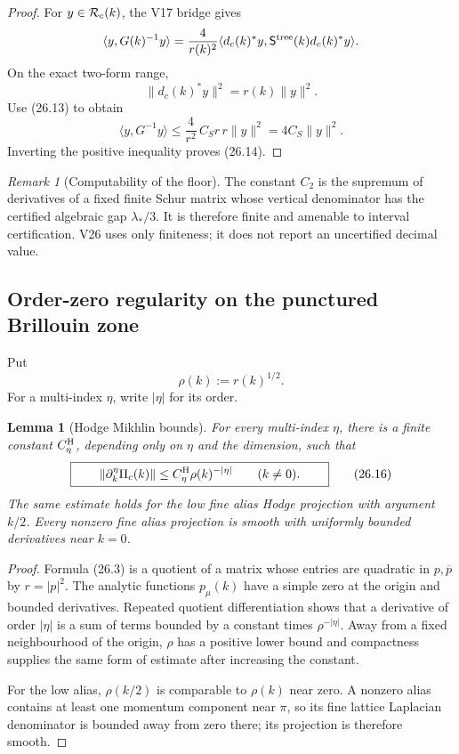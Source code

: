 \documentclass[11pt,oneside]{book}
\newtheorem{lemma}[theorem]{Lemma}
\theoremstyle{definition}
\theoremstyle{remark}
\newtheorem{remark}[theorem]{Remark}
\begin{document}
\begin{proof}
For \(y\in{\cal R}_c(k)\), the V17 bridge gives
\[
 \langle y,G(k)^{-1}y\rangle
 =\frac4{r(k)^2}
 \langle d_c(k)^*y,\mathsf S^{\rm tree}(k)d_c(k)^*y\rangle.
\]
On the exact two-form range,
\[
                  \|d_c(k)^*y\|^2=r(k)\|y\|^2.
\]
Use (26.13) to obtain
\[
 \langle y,G^{-1}y\rangle
 \leq\frac4{r^2}\,C_Sr\,r\|y\|^2
 =4C_S\|y\|^2.
\]
Inverting the positive inequality proves (26.14).
\end{proof}

\begin{remark}[Computability of the floor]
\label{rem:e8v26-computable-floor}
The constant \(C_2\) is the supremum of derivatives of a fixed finite
Schur matrix whose vertical denominator has the certified algebraic
gap \(\lambda_*/3\).  It is therefore finite and amenable to interval
certification.  V26 uses only finiteness; it does not report an
uncertified decimal value.
\end{remark}

\subsection{Order-zero regularity on the punctured Brillouin zone}

Put
\[
                              \rho(k):=r(k)^{1/2}.                 \tag{26.15}
\]
For a multi-index \(\eta\), write \(|\eta|\) for its order.

\begin{lemma}[Hodge Mikhlin bounds]
\label{lem:e8v26-Hodge-Mikhlin}
For every multi-index \(\eta\), there is a finite constant
\(C_\eta^{\rm H}\), depending only on \(\eta\) and the dimension, such
that
\[
\boxed{\qquad
 \|\partial_k^\eta\Pi_c(k)\|
 \leq C_\eta^{\rm H}\rho(k)^{-|\eta|}
 \qquad(k\ne0).
\qquad}                                                           \tag{26.16}
\]
The same estimate holds for the low fine alias Hodge projection with
argument \(k/2\).  Every nonzero fine alias projection is smooth with
uniformly bounded derivatives near \(k=0\).
\end{lemma}

\begin{proof}
Formula (26.3) is a quotient of a matrix whose entries are quadratic
in \(p,\overline p\) by \(r=|p|^2\).  The analytic functions
\(p_\mu(k)\) have a simple zero at the origin and bounded derivatives.
Repeated quotient differentiation shows that a derivative of order
\(|\eta|\) is a sum of terms bounded by a constant times
\(\rho^{-|\eta|}\).  Away from a fixed neighbourhood of the origin,
\(\rho\) has a positive lower bound and compactness supplies the same
form of estimate after increasing the constant.

For the low alias, \(\rho(k/2)\) is comparable to \(\rho(k)\) near
zero.  A nonzero alias contains at least one momentum component near
\(\pi\), so its fine lattice Laplacian denominator is bounded away
from zero there; its projection is therefore smooth.
\end{proof}
\end{document}
